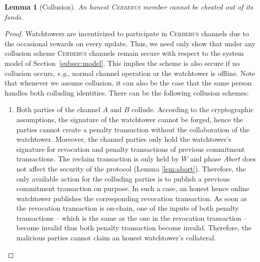 \documentclass[twocolumn,showpacs,%
  nofootinbib,aps,superscriptaddress,%
  eqsecnum,prd,notitlepage,showkeys,10pt]{revtex4-1}
\newtheorem{lemma}{Lemma}
\newcommand{\eg}{{\em e.g.}}
\newcommand{\sys}{\textsc{Cerberus}\xspace}
\begin{document}
\begin{lemma}[Collusion]\label{lem:collusion}
An honest \emph{\sys} member cannot be cheated out of its funds.
\end{lemma}
\begin{proof}
Watchtowers are incentivized to participate in \sys channels due to the occasional rewards on every update.
Thus, we need only show that under any collusion scheme \sys channels remain secure with respect to the system model of Section~\ref{subsec:model}. This implies the scheme is also secure if no collusion occurs, \eg, normal channel operation or the watchtower is offline. Note that whenever we assume collusion, it can also be the case that the same person handles both colluding identities.
There can be the following collusion schemes:
\begin{enumerate}[label=(\roman*)]
    \item Both parties of the channel $A$ and $B$ collude.
    According to the cryptographic assumptions, the signature of the watchtower cannot be forged, hence the parties cannot create a penalty transaction without the collaboration of the watchtower.
    Moreover, the channel parties only hold the watchtower's signature for revocation and penalty transactions of previous commitment transactions. The reclaim transaction is only held by $W$ and phase \textit{Abort} does not affect the security of the protocol (Lemma \ref{lem:abort}). Therefore, the only available action for the colluding parties is to publish a previous commitment transaction on purpose. In such a case, an honest hence online watchtower publishes the corresponding revocation transaction. As soon as the revocation transaction is on-chain, one of the inputs of both penalty transactions -- which is the same as the one in the revocation transaction -- become invalid thus both penalty transaction become invalid. Therefore, the malicious parties cannot claim an honest watchtower's collateral.


\end{enumerate}
\end{proof}
\end{document}
